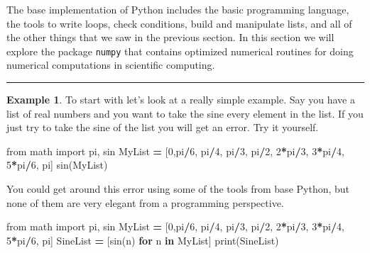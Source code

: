 \documentclass[
]{book}
\newenvironment{Shaded}{\begin{snugshade}}{\end{snugshade}}
\newcommand{\BuiltInTok}[1]{#1}
\newcommand{\ControlFlowTok}[1]{\textcolor[rgb]{0.13,0.29,0.53}{\textbf{#1}}}
\newcommand{\DecValTok}[1]{\textcolor[rgb]{0.00,0.00,0.81}{#1}}
\newcommand{\ImportTok}[1]{#1}
\newcommand{\KeywordTok}[1]{\textcolor[rgb]{0.13,0.29,0.53}{\textbf{#1}}}
\newcommand{\NormalTok}[1]{#1}
\newcommand{\OperatorTok}[1]{\textcolor[rgb]{0.81,0.36,0.00}{\textbf{#1}}}
\theoremstyle{definition}
\theoremstyle{definition}
\newtheorem{example}{Example}[chapter]
\theoremstyle{definition}
\theoremstyle{remark}
\begin{document}
The base implementation of Python includes the basic programming language, the tools to write loops, check conditions, build and manipulate lists, and all of the other things that we saw in the previous section. In this section we will explore the package \texttt{numpy} that contains optimized numerical routines for doing numerical computations in scientific computing.

\begin{center}\rule{0.5\linewidth}{0.5pt}\end{center}

\begin{example}
\protect\hypertarget{exm:unnamed-chunk-708}{}{\label{exm:unnamed-chunk-708} }To start with let's look at a really simple example. Say you have a list of real numbers and you want to take the sine every element in the list. If you just try to take the sine of the list you will get an error. Try it yourself.
\end{example}

\begin{Shaded}
\begin{Highlighting}[]
\ImportTok{from}\NormalTok{ math }\ImportTok{import}\NormalTok{ pi, sin}
\NormalTok{MyList }\OperatorTok{=}\NormalTok{ [}\DecValTok{0}\NormalTok{,pi}\OperatorTok{/}\DecValTok{6}\NormalTok{, pi}\OperatorTok{/}\DecValTok{4}\NormalTok{, pi}\OperatorTok{/}\DecValTok{3}\NormalTok{, pi}\OperatorTok{/}\DecValTok{2}\NormalTok{, }\DecValTok{2}\OperatorTok{*}\NormalTok{pi}\OperatorTok{/}\DecValTok{3}\NormalTok{, }\DecValTok{3}\OperatorTok{*}\NormalTok{pi}\OperatorTok{/}\DecValTok{4}\NormalTok{, }\DecValTok{5}\OperatorTok{*}\NormalTok{pi}\OperatorTok{/}\DecValTok{6}\NormalTok{, pi]}
\NormalTok{sin(MyList)}
\end{Highlighting}
\end{Shaded}

You could get around this error using some of the tools from base Python, but none of them are very elegant from a programming perspective.

\begin{Shaded}
\begin{Highlighting}[]
\ImportTok{from}\NormalTok{ math }\ImportTok{import}\NormalTok{ pi, sin}
\NormalTok{MyList }\OperatorTok{=}\NormalTok{ [}\DecValTok{0}\NormalTok{,pi}\OperatorTok{/}\DecValTok{6}\NormalTok{, pi}\OperatorTok{/}\DecValTok{4}\NormalTok{, pi}\OperatorTok{/}\DecValTok{3}\NormalTok{, pi}\OperatorTok{/}\DecValTok{2}\NormalTok{, }\DecValTok{2}\OperatorTok{*}\NormalTok{pi}\OperatorTok{/}\DecValTok{3}\NormalTok{, }\DecValTok{3}\OperatorTok{*}\NormalTok{pi}\OperatorTok{/}\DecValTok{4}\NormalTok{, }\DecValTok{5}\OperatorTok{*}\NormalTok{pi}\OperatorTok{/}\DecValTok{6}\NormalTok{, pi]}
\NormalTok{SineList }\OperatorTok{=}\NormalTok{ [sin(n) }\ControlFlowTok{for}\NormalTok{ n }\KeywordTok{in}\NormalTok{ MyList]}
\BuiltInTok{print}\NormalTok{(SineList)}
\end{Highlighting}
\end{Shaded}
\end{document}

